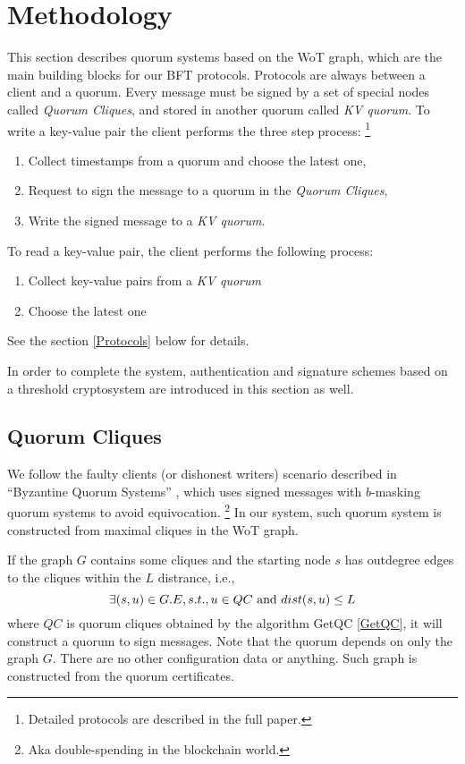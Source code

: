 \section{Methodology}
This section describes quorum systems based on the WoT graph, which
are the main building blocks for our BFT protocols. Protocols are
always between a client and a quorum. Every message must be signed by
a set of special nodes called {\em Quorum Cliques}, and stored in
another quorum called {\em KV quorum}. To write a key-value pair the
client performs the three step process:
\ifdefined\ABSTRACT
\footnote{Detailed protocols are described in the full paper.}
\fi
\begin{enumerate}
\item Collect timestamps from a quorum and choose the latest one,
\item Request to sign the message to a quorum in the {\em Quorum Cliques},
\item Write the signed message to a {\em KV quorum}.
\end{enumerate}
To read a key-value pair, the client performs the following process:
\begin{enumerate}
\item Collect key-value pairs from a {\em KV quorum}
\item Choose the latest one
\end{enumerate}
\ifdefined\ABSTRACT
\else
See the section \ref{Protocols} below for details.
\fi

In order to complete the system, authentication and signature schemes
based on a threshold cryptosystem are introduced in this section as
well.

\subsection{Quorum Cliques}
We follow the faulty clients (or dishonest writers) scenario described
in ``Byzantine Quorum Systems'' \cite{Delhi:1,Delhi:2}, which uses
signed messages with $b$-masking quorum systems to avoid equivocation.
\footnote{Aka double-spending in the blockchain world.}
In our system, such quorum system is constructed from maximal cliques
in the WoT graph.

If the graph $G$ contains some cliques and the starting node $s$ has
outdegree edges to the cliques within the $L$ distrance, i.e.,
\[
\exists (s, u) \in G.E, s.t., u \in QC \text{ and } dist(s, u) \le L \\
\]
where $QC$ is quorum cliques obtained by the algorithm {\sf GetQC}
\ref{GetQC},
it will construct a quorum to sign messages. Note that the quorum
depends on only the graph $G$. There are no other configuration data
or anything.
Such graph is constructed from the quorum certificates. 

